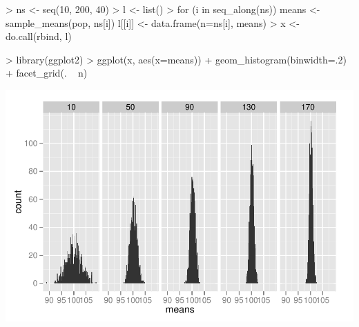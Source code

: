 \begin{Schunk}
\begin{Sinput}
> ns <- seq(10, 200, 40)
> l <- list()
> for (i in seq_along(ns)){
   means <- sample_means(pop, ns[i])
   l[[i]] <- data.frame(n=ns[i], means)  
 }       
> x <- do.call(rbind, l)
\end{Sinput}
\end{Schunk}

\begin{Schunk}
\begin{Sinput}
> library(ggplot2)
> ggplot(x, aes(x=means)) + geom_histogram(binwidth=.2) +
   facet_grid(. ~ n)
\end{Sinput}
\end{Schunk}
\includegraphics{sim_mean_dist-005}










